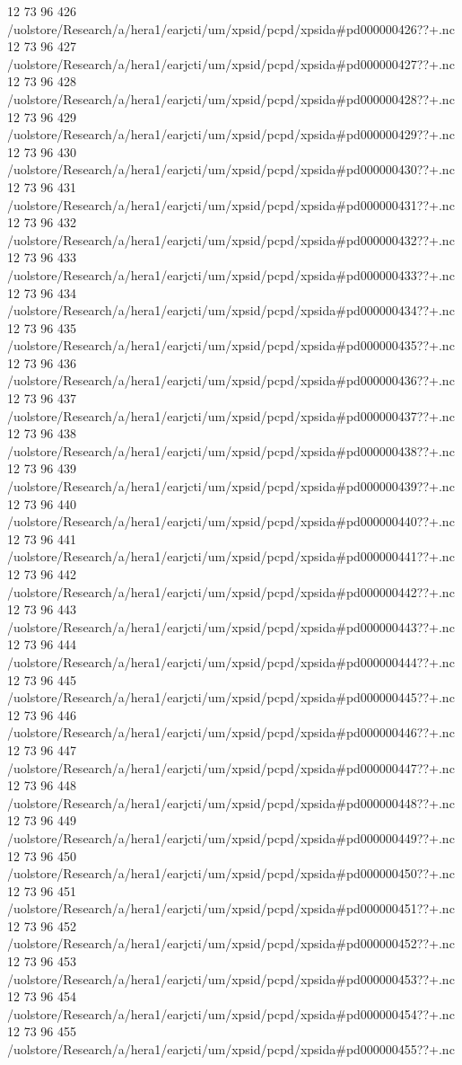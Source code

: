 12 73 96
426
/uolstore/Research/a/hera1/earjcti/um/xpsid/pcpd/xpsida#pd000000426??+.nc
12 73 96
427
/uolstore/Research/a/hera1/earjcti/um/xpsid/pcpd/xpsida#pd000000427??+.nc
12 73 96
428
/uolstore/Research/a/hera1/earjcti/um/xpsid/pcpd/xpsida#pd000000428??+.nc
12 73 96
429
/uolstore/Research/a/hera1/earjcti/um/xpsid/pcpd/xpsida#pd000000429??+.nc
12 73 96
430
/uolstore/Research/a/hera1/earjcti/um/xpsid/pcpd/xpsida#pd000000430??+.nc
12 73 96
431
/uolstore/Research/a/hera1/earjcti/um/xpsid/pcpd/xpsida#pd000000431??+.nc
12 73 96
432
/uolstore/Research/a/hera1/earjcti/um/xpsid/pcpd/xpsida#pd000000432??+.nc
12 73 96
433
/uolstore/Research/a/hera1/earjcti/um/xpsid/pcpd/xpsida#pd000000433??+.nc
12 73 96
434
/uolstore/Research/a/hera1/earjcti/um/xpsid/pcpd/xpsida#pd000000434??+.nc
12 73 96
435
/uolstore/Research/a/hera1/earjcti/um/xpsid/pcpd/xpsida#pd000000435??+.nc
12 73 96
436
/uolstore/Research/a/hera1/earjcti/um/xpsid/pcpd/xpsida#pd000000436??+.nc
12 73 96
437
/uolstore/Research/a/hera1/earjcti/um/xpsid/pcpd/xpsida#pd000000437??+.nc
12 73 96
438
/uolstore/Research/a/hera1/earjcti/um/xpsid/pcpd/xpsida#pd000000438??+.nc
12 73 96
439
/uolstore/Research/a/hera1/earjcti/um/xpsid/pcpd/xpsida#pd000000439??+.nc
12 73 96
440
/uolstore/Research/a/hera1/earjcti/um/xpsid/pcpd/xpsida#pd000000440??+.nc
12 73 96
441
/uolstore/Research/a/hera1/earjcti/um/xpsid/pcpd/xpsida#pd000000441??+.nc
12 73 96
442
/uolstore/Research/a/hera1/earjcti/um/xpsid/pcpd/xpsida#pd000000442??+.nc
12 73 96
443
/uolstore/Research/a/hera1/earjcti/um/xpsid/pcpd/xpsida#pd000000443??+.nc
12 73 96
444
/uolstore/Research/a/hera1/earjcti/um/xpsid/pcpd/xpsida#pd000000444??+.nc
12 73 96
445
/uolstore/Research/a/hera1/earjcti/um/xpsid/pcpd/xpsida#pd000000445??+.nc
12 73 96
446
/uolstore/Research/a/hera1/earjcti/um/xpsid/pcpd/xpsida#pd000000446??+.nc
12 73 96
447
/uolstore/Research/a/hera1/earjcti/um/xpsid/pcpd/xpsida#pd000000447??+.nc
12 73 96
448
/uolstore/Research/a/hera1/earjcti/um/xpsid/pcpd/xpsida#pd000000448??+.nc
12 73 96
449
/uolstore/Research/a/hera1/earjcti/um/xpsid/pcpd/xpsida#pd000000449??+.nc
12 73 96
450
/uolstore/Research/a/hera1/earjcti/um/xpsid/pcpd/xpsida#pd000000450??+.nc
12 73 96
451
/uolstore/Research/a/hera1/earjcti/um/xpsid/pcpd/xpsida#pd000000451??+.nc
12 73 96
452
/uolstore/Research/a/hera1/earjcti/um/xpsid/pcpd/xpsida#pd000000452??+.nc
12 73 96
453
/uolstore/Research/a/hera1/earjcti/um/xpsid/pcpd/xpsida#pd000000453??+.nc
12 73 96
454
/uolstore/Research/a/hera1/earjcti/um/xpsid/pcpd/xpsida#pd000000454??+.nc
12 73 96
455
/uolstore/Research/a/hera1/earjcti/um/xpsid/pcpd/xpsida#pd000000455??+.nc
